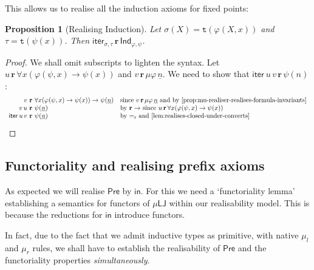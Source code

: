 \documentclass[10pt,a4paper]{amsart}
\theoremstyle{plain}
\newtheorem{proposition}[proposition]{Proposition}
\theoremstyle{definition}
\renewcommand{\phi}{\varphi}
\theoremstyle{plain}
\theoremstyle{definition} %
\newcommand{\numeral}[1]{\underline{#1}}
\newcommand{\iter}[1]{\mathsf{iter}_{#1}}
\newcommand{\inj}{\mathsf{in}}
\newcommand{\lr}[1]{#1_l}
\newcommand{\rr}[1]{#1_r}
\newcommand{\LJ}{\mathsf{LJ}}
\newcommand{\muLJ}{\mu\LJ}
\newcommand{\reduction}{\mathrm{r}}
\newcommand{\converts}{=_{\reduction}}
\newcommand{\limp}{\to}
\newcommand{\preaxiom}{\mathsf{Pre}}
\newcommand{\indaxiom}{\mathsf{Ind}}
\newcommand{\realises}{\mathbf{r}}
\newcommand{\type}[1]{\mathtt t (#1)}
\begin{document}
This allows us to realise all the induction axioms for fixed points:
\begin{proposition}
    [Realising Induction]
    \label{prop:iter-realises-ind}
    Let $\sigma(X) = \type {\phi(X,x)}$ and $\tau = \type{\psi(x)}$. 
    Then  $\iter{\sigma,\tau}\, \realises\, \indaxiom_{\phi,\psi}$.
\end{proposition}
\begin{proof}
    We shall omit subscripts to lighten the syntax.
    Let $u\, \realises\, \forall x (\phi(\psi,x) \limp \psi(x))$ and $v \, \realises\, \mu\phi\, \numeral n$.
    We need to show that $\iter{}\, u\, v\, \realises\, \psi(n)$:
    \[
    \begin{array}[b]{r@{\ \realises\ }ll}
         v & \forall x (\phi(\psi,x) \limp \psi(x)) \limp \psi(\numeral n) & \text{since $v\, \realises\, \mu\phi\, \numeral n$ and by \Cref{prop:mu-realiser-realises-formula-invariants}} \\
         v\, u & \psi(\numeral n) & \text{by $\realises\limp$ since $u\, \realises \, \forall x (\phi(\psi,x) \limp \psi(x))$}\\
         \iter\, u\, v & \psi(\numeral n) & \text{by $\converts$ and \Cref{lem:realises-closed-under-converts}}  \tag*{\qed}
    \end{array}
    \]
\renewcommand{\qed}{}
\end{proof}


\subsection{Functoriality and realising prefix axioms}

As expected we will realise $\preaxiom$ by $\inj$.
For this we need a `functoriality lemma' establishing a semantics for functors of $\muLJ$ within our realisability model.
This is because the reductions for $\inj$ introduce functors.

In fact, due to the fact that we admit inductive types as primitive, with native $\lr\mu$ and $\rr \mu$ rules, we shall have to establish the realisability of $\preaxiom$ and the functoriality properties \emph{simultaneously}.
\end{document}
